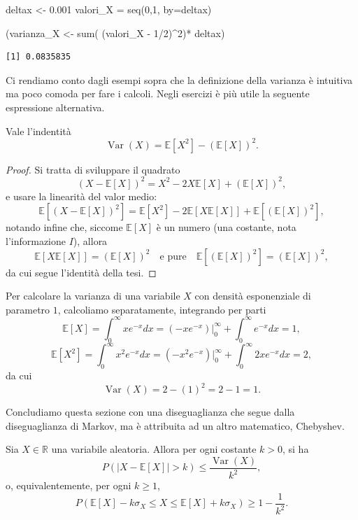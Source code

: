 \documentclass[
  italian,
  letterpaper,
]{book}
\newenvironment{Shaded}{\begin{snugshade}}{\end{snugshade}}
\newcommand{\AttributeTok}[1]{\textcolor[rgb]{0.40,0.45,0.13}{#1}}
\newcommand{\DecValTok}[1]{\textcolor[rgb]{0.68,0.00,0.00}{#1}}
\newcommand{\FloatTok}[1]{\textcolor[rgb]{0.68,0.00,0.00}{#1}}
\newcommand{\FunctionTok}[1]{\textcolor[rgb]{0.28,0.35,0.67}{#1}}
\newcommand{\NormalTok}[1]{\textcolor[rgb]{0.00,0.23,0.31}{#1}}
\newcommand{\OtherTok}[1]{\textcolor[rgb]{0.00,0.23,0.31}{#1}}
\newcommand{\SpecialCharTok}[1]{\textcolor[rgb]{0.37,0.37,0.37}{#1}}
\newcommand{\bra}[1]{\left( #1 \right)}
\newcommand{\sqa}[1]{\left[ #1 \right]}
\newcommand{\R}{\mathbb{R}}
\newcommand{\E}[1]{\mathbb{E}\sqa{#1}}
\newcommand{\Var}[1]{\operatorname{Var}\bra{#1}}
\theoremstyle{definition}
\theoremstyle{remark}
\begin{document}
\begin{Shaded}
\begin{Highlighting}[]
\NormalTok{deltax }\OtherTok{\textless{}{-}} \FloatTok{0.001}
\NormalTok{valori\_X }\OtherTok{=} \FunctionTok{seq}\NormalTok{(}\DecValTok{0}\NormalTok{,}\DecValTok{1}\NormalTok{, }\AttributeTok{by=}\NormalTok{deltax)}

\NormalTok{(varianza\_X }\OtherTok{\textless{}{-}} \FunctionTok{sum}\NormalTok{( (valori\_X }\SpecialCharTok{{-}} \DecValTok{1}\SpecialCharTok{/}\DecValTok{2}\NormalTok{)}\SpecialCharTok{\^{}}\DecValTok{2}\NormalTok{)}\SpecialCharTok{*}\NormalTok{ deltax)}
\end{Highlighting}
\end{Shaded}

\begin{verbatim}
[1] 0.0835835
\end{verbatim}

Ci rendiamo conto dagli esempi sopra che la definizione della varianza è
intuitiva ma poco comoda per fare i calcoli. Negli esercizi è più utile
la seguente espressione alternativa.

\protect{}\label{varianza-alternativa}
Vale l'indentità \[ \Var{X} = \E{X^2} - (\E{X})^2.\]

\begin{proof}
Si tratta di sviluppare il quadrato
\[ (X-\E{X})^2 = X^2 -2 X \E{X} + (\E{X})^2,\] e usare la linearità del
valor medio:
\[ \E{ (X-\E{X})^2} = \E{X^2} - 2 \E{X \E{X}} + \E{(\E{X})^2},\] notando
infine che, siccome \(\E{X}\) è un numero (una costante, nota
l'informazione \(I\)), allora
\[ \E{X\E{X}} = (\E{X})^2 \quad \text{e pure} \quad \E{(\E{X})^2} = (\E{X})^2,\]
da cui segue l'identità della tesi.
\end{proof}

Per calcolare la varianza di una variabile \(X\) con densità
esponenziale di parametro \(1\), calcoliamo separatamente, integrando
per parti
\[ \E{X} = \int_0^\infty x e^{-x} d x = (-xe^{-x})|_0^\infty + \int_0^\infty e^{-x} d x = 1,\]
\[ \E{X^2} = \int_0^\infty x^2 e^{-x} d x = (-x^2e^{-x})|_0^\infty + \int_0^\infty 2 x e^{-x} d x = 2,\]
da cui \[ \Var{X} = 2 - (1)^2 = 2-1 = 1.\]

Concludiamo questa sezione con una diseguaglianza che segue dalla
diseguaglianza di Markov, ma è attribuita ad un altro matematico,
Chebyshev.

Sia \(X \in \R\) una variabile aleatoria. Allora per ogni costante
\(k>0\), si ha \[ P( |X - \E{X}| > k) \le \frac{ \Var{X}}{k^2},\] o,
equivalentemente, per ogni \(k \ge 1\),
\[ P( \E{X}- k \sigma_X \le X \le \E{X}+ k \sigma_X ) \ge 1-\frac{1}{k^2}.\]
\end{document}
